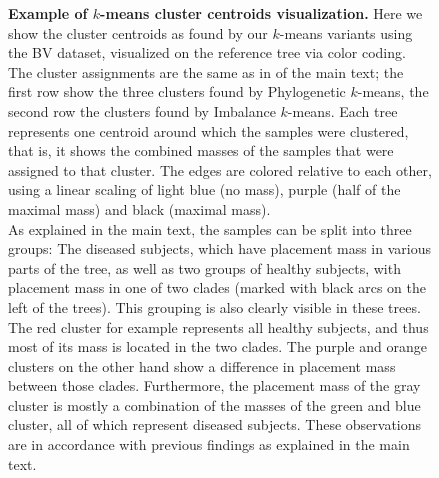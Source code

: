 \begin{figure}[hpbt]
    \centering
    \caption[Example of $k$-means cluster centroids visualization]{
        \textbf{Example of $k$-means cluster centroids visualization.}
        Here we show the cluster centroids as found by our $k$-means variants using the \ac{BV} dataset,
        visualized on the reference tree via color coding.
        The cluster assignments are the same as in  of the main text;
        the first row show the three clusters found by Phylogenetic $k$-means,
        the second row the clusters found by Imbalance $k$-means.
        Each tree represents one centroid around which the samples were clustered,
        that is, it shows the combined masses of the samples that were assigned to that cluster.
        The edges are colored relative to each other, using a linear scaling of
        light blue (no mass), purple (half of the maximal mass) and black (maximal mass).
        \\
        As explained in the main text, the samples can be split into three groups:
        The diseased subjects, which have placement mass in various parts of the tree,
        as well as two groups of healthy subjects, with placement mass in one of two  clades
        (marked with black arcs on the left of the trees).
        This grouping is also clearly visible in these trees.
        The red cluster for example represents all healthy subjects,
        and thus most of its mass is located in the two  clades.
        The purple and orange clusters on the other hand show a difference in placement mass between those clades.
        Furthermore, the placement mass of the gray cluster is mostly
        a combination of the masses of the green and blue cluster,
        all of which represent diseased subjects.
        These observations are in accordance with previous findings as explained in the main text.
    }
    \label{fig:centroids}
\end{figure}


